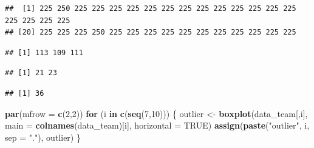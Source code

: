 \documentclass[
]{article}
\newenvironment{Shaded}{\begin{snugshade}}{\end{snugshade}}
\newcommand{\CommentTok}[1]{\textcolor[rgb]{0.56,0.35,0.01}{\textit{#1}}}
\newcommand{\ControlFlowTok}[1]{\textcolor[rgb]{0.13,0.29,0.53}{\textbf{#1}}}
\newcommand{\DataTypeTok}[1]{\textcolor[rgb]{0.13,0.29,0.53}{#1}}
\newcommand{\DecValTok}[1]{\textcolor[rgb]{0.00,0.00,0.81}{#1}}
\newcommand{\FloatTok}[1]{\textcolor[rgb]{0.00,0.00,0.81}{#1}}
\newcommand{\KeywordTok}[1]{\textcolor[rgb]{0.13,0.29,0.53}{\textbf{#1}}}
\newcommand{\NormalTok}[1]{#1}
\newcommand{\OperatorTok}[1]{\textcolor[rgb]{0.81,0.36,0.00}{\textbf{#1}}}
\newcommand{\OtherTok}[1]{\textcolor[rgb]{0.56,0.35,0.01}{#1}}
\newcommand{\StringTok}[1]{\textcolor[rgb]{0.31,0.60,0.02}{#1}}
\begin{document}
\begin{verbatim}
##  [1] 225 250 225 225 225 225 225 225 225 225 225 225 225 225 225 225 225 225 225
## [20] 225 225 225 250 225 225 225 225 225 225 225 225 225 225 225
\end{verbatim}

\begin{Shaded}
\end{Shaded}

\begin{verbatim}
## [1] 113 109 111
\end{verbatim}

\begin{Shaded}
\end{Shaded}

\begin{verbatim}
## [1] 21 23
\end{verbatim}

\begin{Shaded}
\end{Shaded}

\begin{verbatim}
## [1] 36
\end{verbatim}

\newpage

\begin{Shaded}
\begin{Highlighting}[]
\KeywordTok{par}\NormalTok{(}\DataTypeTok{mfrow =} \KeywordTok{c}\NormalTok{(}\DecValTok{2}\NormalTok{,}\DecValTok{2}\NormalTok{))}
\ControlFlowTok{for}\NormalTok{ (i }\ControlFlowTok{in} \KeywordTok{c}\NormalTok{(}\KeywordTok{seq}\NormalTok{(}\DecValTok{7}\NormalTok{,}\DecValTok{10}\NormalTok{))) \{}
\NormalTok{  outlier <-}\StringTok{ }\KeywordTok{boxplot}\NormalTok{(data_team[,i], }\DataTypeTok{main =} \KeywordTok{colnames}\NormalTok{(data_team)[i], }\DataTypeTok{horizontal =} \OtherTok{TRUE}\NormalTok{)}
  \KeywordTok{assign}\NormalTok{(}\KeywordTok{paste}\NormalTok{(}\StringTok{"outlier"}\NormalTok{, i, }\DataTypeTok{sep =} \StringTok{"."}\NormalTok{), outlier)}
\NormalTok{\}}
\end{Highlighting}
\end{Shaded}
\end{document}
